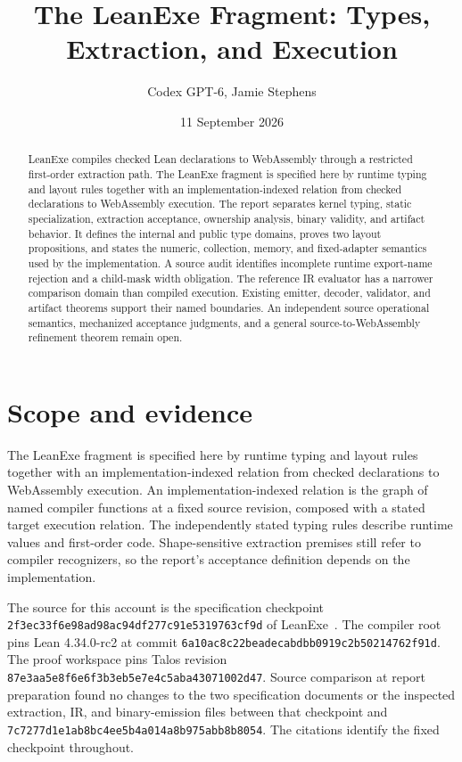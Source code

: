 \documentclass[11pt]{article}
\title{The LeanExe Fragment: Types, Extraction, and Execution}
\author{Codex GPT-6, Jamie Stephens}
\date{11 September 2026}
\newcommand{\code}[1]{\texttt{#1}}
\begin{document}
\maketitle
\begin{abstract}
LeanExe compiles checked Lean declarations to WebAssembly through a restricted first-order extraction path.  The LeanExe fragment is specified here by runtime typing and layout rules together with an implementation-indexed relation from checked declarations to WebAssembly execution.  The report separates kernel typing, static specialization, extraction acceptance, ownership analysis, binary validity, and artifact behavior.  It defines the internal and public type domains, proves two layout propositions, and states the numeric, collection, memory, and fixed-adapter semantics used by the implementation.  A source audit identifies incomplete runtime export-name rejection and a child-mask width obligation.  The reference IR evaluator has a narrower comparison domain than compiled execution.  Existing emitter, decoder, validator, and artifact theorems support their named boundaries.  An independent source operational semantics, mechanized acceptance judgments, and a general source-to-WebAssembly refinement theorem remain open.
\end{abstract}

\section{Scope and evidence}

The LeanExe fragment is specified here by runtime typing and layout rules together with an implementation-indexed relation from checked declarations to WebAssembly execution.  An implementation-indexed relation is the graph of named compiler functions at a fixed source revision, composed with a stated target execution relation.  The independently stated typing rules describe runtime values and first-order code.  Shape-sensitive extraction premises still refer to compiler recognizers, so the report's acceptance definition depends on the implementation.

The source for this account is the specification checkpoint \code{2f3ec33f6e98ad98ac94df277c91e5319763cf9d} of LeanExe~\cite{checkpoint}.  The compiler root pins Lean 4.34.0-rc2 at commit \code{6a10ac8c22beadecabdbb0919c2b50214762f91d}.  The proof workspace pins Talos revision \code{87e3aa5e8f6e6f3b3eb5e7e4c5aba43071002d47}.  Source comparison at report preparation found no changes to the two specification documents or the inspected extraction, IR, and binary-emission files between that checkpoint and \code{7c7277d1e1ab8bc4ee5b4a014a8b975abb8b8054}.  The citations identify the fixed checkpoint throughout.
\end{document}
